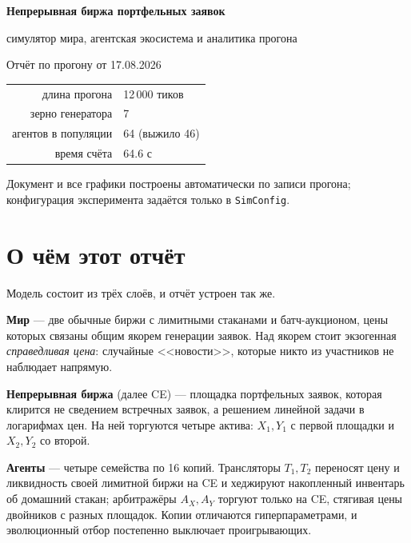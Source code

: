 \documentclass[11pt,a4paper]{article}
\newcommand{\term}[1]{\textbf{#1}}
\newcommand{\code}[1]{\texttt{\small #1}}
\begin{document}
\begin{titlepage}
\centering
\vspace*{3cm}
{\sffamily\Huge\bfseries Непрерывная биржа портфельных заявок\par}
\vspace{0.6cm}
{\sffamily\LARGE симулятор мира, агентская экосистема и аналитика прогона\par}
\vspace{2.5cm}
{\large Отчёт по прогону от 17.08.2026\par}
\vspace{1.2cm}
\begin{tabular}{rl}
длина прогона & 12\,000 тиков \\
зерно генератора & 7 \\
агентов в популяции & 64 (выжило 46) \\
время счёта & 64.6 с \\
\end{tabular}
\vfill
{\small Документ и все графики построены автоматически по записи прогона;\\
конфигурация эксперимента задаётся только в \code{SimConfig}.\par}
\end{titlepage}

\tableofcontents
\clearpage

\section*{О чём этот отчёт}

Модель состоит из трёх слоёв, и отчёт устроен так же.

\term{Мир} --- две обычные биржи с лимитными стаканами и батч-аукционом,
цены которых связаны общим якорем генерации заявок. Над якорем стоит
экзогенная \emph{справедливая цена}: случайные <<новости>>, которые никто
из участников не наблюдает напрямую.

\term{Непрерывная биржа} (далее CE) --- площадка портфельных заявок,
которая клирится не сведением встречных заявок, а решением линейной задачи
в логарифмах цен. На ней торгуются четыре актива: \(X_1, Y_1\) с первой
площадки и \(X_2, Y_2\) со второй.

\term{Агенты} --- четыре семейства по 16 копий. Трансляторы \(T_1, T_2\)
переносят цену и ликвидность своей лимитной биржи на CE и хеджируют
накопленный инвентарь об домашний стакан; арбитражёры \(A_X, A_Y\)
торгуют только на CE, стягивая цены двойников с разных площадок.
Копии отличаются гиперпараметрами, и эволюционный отбор постепенно
выключает проигрывающих.
\end{document}
